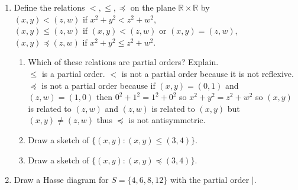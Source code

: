 \documentclass[11pt]{article}
\newcommand{\R}{\mathbb{R}}
\begin{document}
\begin{enumerate}
\begin{enumerate}
	\end{enumerate}
\setcounter{enumi}{14}
\item Define the relations $<,\leq,\preceq$ on the plane $\R\times\R$ by\\
$(x,y)<(z,w)$ if $x^2+y^2<z^2+w^2$,\\
$(x,y)\leq(z,w)$ if $(x,y)<(z,w)$ or $(x,y)=(z,w)$,\\
$(x,y)\preceq(z,w)$ if $x^2+y^2\leq z^2+w^2$.
	\begin{enumerate}
	\item Which of these relations are partial orders? Explain.\\
	$\leq$ is a partial order. $<$ is not a partial order because it is not reflexive. $\preceq$ is not a partial order because 
	if $(x,y)=(0,1)$ and $(z,w)=(1,0)$ then $0^2+1^2=1^2+0^2$ so $x^2+y^2 = z^2+w^2$ so $(x,y)$ is related to $(z,w)$ and $(z,w)$ 	is related to $(x,y)$ but $(x,y)\not=(z,w)$ thus $\preceq$ is not antisymmetric.
	\setcounter{enumii}{2}
	\item Draw a sketch of $\{(x,y):(x,y)\leq (3,4)\}$.\\
	\item Draw a sketch of $\{(x,y):(x,y)\preceq (3,4)\}$.\\
	\end{enumerate}
\setcounter{enumi}{0}
\item Draw a Hasse diagram for $S=\{4,6,8,12\}$ with the partial order $\mid$.\\
\end{enumerate}
\end{document}
